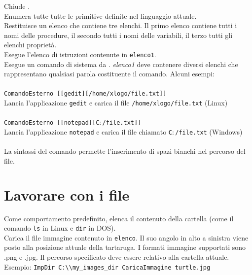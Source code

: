 Chiude \xlogo.\\

Enumera tutte tutte le primitive definite nel linguaggio attuale.\\

Restituisce un elenco che contiene tre elenchi. Il primo elenco contiene tutti i nomi delle procedure, il secondo tutti i nomi delle variabili, il terzo tutti gli elenchi proprietà.\\

Esegue l'elenco di istruzioni contenute in \texttt{elenco1}.\\

Esegue un comando di sistema da \xlogo. \textit{elenco1} deve contenere diversi elenchi che rappresentano qualsiasi parola costituente il comando. Alcuni esempi:\\ \\
\texttt{ComandoEsterno [[gedit][/home/xlogo/file.txt]]}\\
Lancia l'applicazione \texttt{gedit} e carica il file \texttt{/home/xlogo/file.txt} (Linux)\\ \\
\texttt{ComandoEsterno [[notepad][C$\colon$/file.txt]]}\\
Lancia l'applicazione \texttt{notepad} e carica il file chiamato \texttt{C$\colon$/file.txt} (Windows)\\ \\
La sintassi del comando permette l'inserimento di spazi bianchi nel percorso del file.


\section{Lavorare con i file}
Come comportamento predefinito, elenca il contenuto della cartella (come il comando \texttt{ls} in Linux e \texttt{dir} in DOS).\\

Carica il file immagine contenuto in \texttt{elenco}. Il suo angolo in alto a sinistra viene posto alla posizione attuale della tartaruga. I formati immagine supportati sono .png e .jpg. Il percorso specificato deve essere relativo alla cartella attuale. Esempio: \texttt{ImpDir \textquotedbl C:\textbackslash\textbackslash my\_images\_dir CaricaImmagine \textquotedbl turtle.jpg} \\

